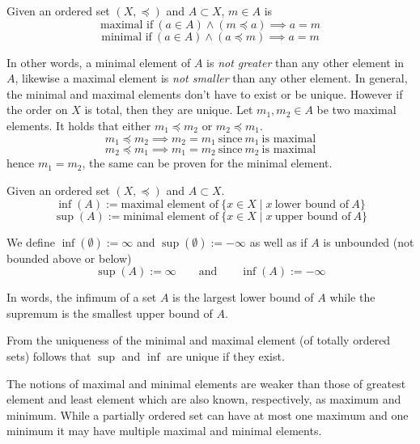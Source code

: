 \begin{definition}
   Given an ordered set \((X, \preceq)\) and \(A \subset X\), \(m \in A\) is
   \[\text{maximal if}~(a \in A) \land (m \preceq a) \implies a = m\]
   \[\text{minimal if}~(a \in A) \land (a \preceq m) \implies a = m\]
\end{definition}
\begin{remark}[Intuition]
   In other words, a minimal element of \(A\) is \emph{not greater} than any other element in \(A\), likewise a maximal element is \emph{not smaller} than any other element.
   In general, the minimal and maximal elements don't have to exist or be unique.
   However if the order on \(X\) is total, then they are unique.
   Let \(m_1, m_2 \in A\) be two maximal elements.
   It holds that either \(m_1 \preceq m_2\) or \(m_2 \preceq m_1\).
   \[m_1 \preceq m_2 \implies m_2 = m_1~\text{since}~m_1~\text{is maximal}\]
   \[m_2 \preceq m_1 \implies m_1 = m_2~\text{since}~m_2~\text{is maximal}\]
   hence \(m_1 = m_2\), the same can be proven for the minimal element.
\end{remark}

\begin{definition}
   Given an ordered set \((X, \preceq)\) and \(A \subset X\).
   \[\inf(A) := \text{maximal element of}~\{x \in X \mid x~\text{lower bound of}~A\}\]
   \[\sup(A) := \text{minimal element of}~\{x \in X \mid x~\text{upper bound of}~A\}\]
\end{definition}
\begin{remark}[Notation]
   We define \(\inf(\emptyset) := \infty\) and \(\sup(\emptyset) := -\infty\) as well as if \(A\) is unbounded (not bounded above or below)
   \[\sup(A) := \infty \qquad\text{and}\qquad \inf(A) := -\infty\]
\end{remark}
\begin{remark}[Intuition]
   In words, the infimum of a set \(A\) is the largest lower bound of \(A\) while the supremum is the smallest upper bound of \(A\).
\end{remark}
\begin{remark}
   From the uniqueness of the minimal and maximal element (of totally ordered sets) follows that \(\sup\) and \(\inf\) are unique if they exist.
\end{remark}

The notions of maximal and minimal elements are weaker than those of greatest element and least element which are also known, respectively, as maximum and minimum.
While a partially ordered set can have at most one maximum and one minimum it may have multiple maximal and minimal elements.

